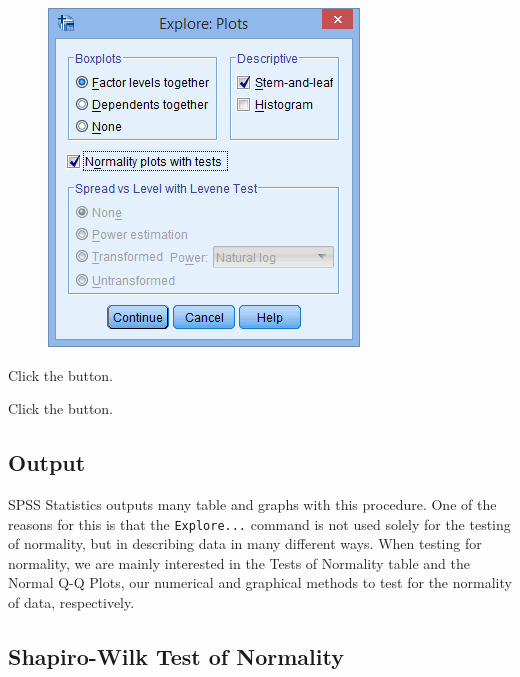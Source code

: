 \documentclass[]{article}
\begin{document}
\begin{figure}
	\centering
	\includegraphics[width=0.7\linewidth]{Normality/normality-6}
	\caption{}
	\label{fig:normality-6}
\end{figure}

Click the  button.

Click the  button.

\subsection{Output}
SPSS Statistics outputs many table and graphs with this procedure. One of the reasons for this is that the \texttt{Explore...} command is not used solely for the testing of normality, but in describing data in many different ways. When testing for normality, we are mainly interested in the Tests of Normality table and the Normal Q-Q Plots, our numerical and graphical methods to test for the normality of data, respectively.

\subsection{Shapiro-Wilk Test of Normality}
\end{document}
